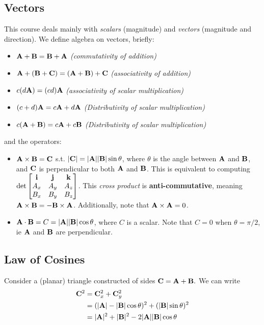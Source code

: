 \documentclass[12pt]{article}
\begin{document}
\subsection{Vectors}
This course deals mainly with \textit{scalars} (magnitude) and \textit{vectors} (magnitude and direction). We define algebra on vectors, briefly:
\begin{itemize}
  \item $\vb{A} + \vb{B} = \vb{B} + \vb{A}$ \textit{(commutativity of addition)}
  \item $\vb{A} + (\vb{B} + \vb{C}) = (\vb{A} + \vb{B}) + \vb{C}$ \textit{(associativity of addition)}
  \item $c(d\vb{A}) = (cd)\vb{A}$ \textit{(associativity of scalar multiplication)}
  \item $(c+d)\vb{A} = c \vb{A} + d\vb{A}$ \textit{(Distributivity of scalar multiplication)}
  \item $c(\vb{A} + \vb{B}) = c\vb{A} + c\vb{B}$ \textit{(Distributivity of scalar multiplication)}
\end{itemize}
and the operators:
\begin{itemize}
  \item $\vb{A} \times \vb{B} = \vb{C}$ s.t. $|\vb{C}| = |\vb{A}||\vb{B}|\sin \theta$, where $\theta$ is the angle between $\vb{A}$ and $\vb{B}$, and $\vb{C}$ is perpendicular to both $\vb{A}$ and $\vb{B}$. This is equivalent to computing $\det \begin{bmatrix} \vb{i} & \vb{j} & \vb{k} \\ A_x & A_y & A_z \\ B_x & B_y & B_z \end{bmatrix}$.  This \textit{cross product} is \textbf{anti-commutative}, meaning $\vb{A} \times \vb{B} = -\vb{B} \times \vb{A}$. Additionally, note that $\vb{A} \times \vb{A} = 0$.
  \item $\vb{A}\cdot \vb{B} = C = |\vb{A}||\vb{B}|\cos \theta$, where $C$ is a scalar. Note that $C = 0$ when $\theta = \pi/2$, ie $\vb{A}$ and $\vb{B}$ are perpendicular.
\end{itemize}

\subsection{Law of Cosines}

Consider a (planar) triangle constructed of sides $\vb{C} = \vb{A} + \vb{B}.$ We can write \begin{align*}
  \vb{C}^2 &= \vb{C}_x^2 + \vb{C}_y^2\\
  &= (|\vb{A}| - |\vb{B}|\cos \theta)^2 + (|\vb{B}|\sin \theta)^2\\
  &= |\vb{A}|^2 + |\vb{B}|^2 - 2|\vb{A}||\vb{B}|\cos \theta
\end{align*}
\end{document}
